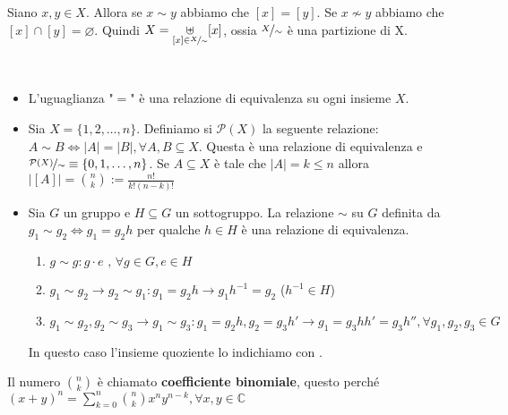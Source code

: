 \documentclass[../main.tex]{subfiles}
\begin{document}
\begin{definition}[Partizione]
    Siano $x,y \in X$. Allora se $x \sim y$ abbiamo che $[x] = [y]$. Se $x \nsim y$ abbiamo che $[x] \cap [y] = \varnothing$. Quindi $X = \underset{[x] \in \nicefrac{X}{\sim}}{\uplus} [x]$, ossia $\nicefrac{X}{\sim}$ è una partizione di X.
\end{definition}

\begin{example}
    \
    \begin{itemize}
        \item L'uguaglianza "$=$" è una relazione di equivalenza
              su ogni insieme $X$.
        \item Sia $X = \{1,2,\ldots,n\}$. Definiamo si $\mathcal{P}(X)$
              la seguente relazione:
              $A \sim B \iff |A| = |B|, \forall A,B \subseteq X$.
              Questa è una relazione di equivalenza e $\nicefrac{\mathcal{P}(X)}{\sim}
                  \equiv \{0,1,\ldots,n\}$. Se $A \subseteq X$ è tale che
              $|A| = k \leq n$ allora $|[A]| = \binom{n}{k} := \frac{n!}{k!(n-k)!}$
        \item Sia $G$ un gruppo e $H \subseteq G$ un sottogruppo. La relazione
              $\sim $ su $G$ definita da $g_1 \sim g_2 \iff g_1=g_2 h$
              per qualche $h \in H$ è una relazione di equivalenza.\
              \begin{enumerate}
                  \item $g \sim g : g \cdot e \text{ , } \forall g \in G , e \in H$
                  \item $g_1 \sim g_2 \rightarrow g_2 \sim g_1 : g_1 = g_2 h \rightarrow
                            g_1 h^{-1} = g_2$ ($h^{-1} \in H$)
                  \item $g_1 \sim g_2 , g_2 \sim g_3 \rightarrow g_1 \sim g_3 :
                            g_1 = g_2 h, g_2 = g_3 h' \rightarrow g_1 = g_3 h h' = g_3 h''
                            , \forall g_1,g_2,g_3 \in G$
              \end{enumerate}
              In questo caso l'insieme quoziente lo indichiamo con .

    \end{itemize}
\end{example}

\begin{definition}
    Il numero $\binom{n}{k}$ è chiamato \textbf{coefficiente binomiale}, questo perché $(x+y)^n = \sum_{k=0}^{n} \binom{n}{k} x^n y^{n-k}, \forall x,y \in \mathbb{C} $
\end{definition}
\end{document}
